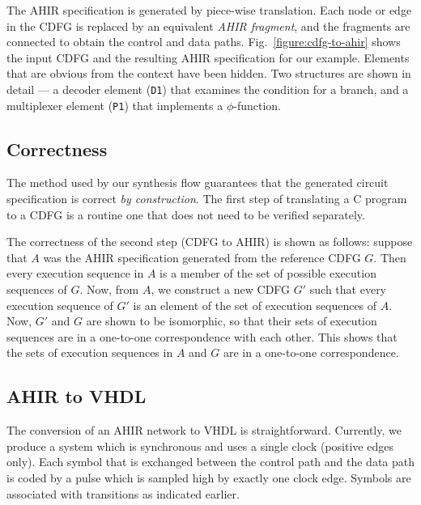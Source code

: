 \documentclass[conference]{IEEEtran}
\begin{document}
The AHIR specification is generated by piece-wise translation. Each
node or edge in the CDFG is replaced by an equivalent \emph{AHIR
  fragment}, and the fragments are connected to obtain the control and
data paths. Fig.~\ref{figure:cdfg-to-ahir} shows the input CDFG and
the resulting AHIR specification for our example. Elements that are
obvious from the context have been hidden. Two structures are shown in
detail --- a decoder element (\texttt{D1}) that examines the condition
for a branch, and a multiplexer element (\texttt{P1}) that implements
a $\phi$-function.

\subsection{Correctness}

The method used by our synthesis flow guarantees that the generated
circuit specification is correct {\em by construction}. The first step
of translating a C program to a CDFG is a routine one that does not
need to be verified separately. 

The correctness of the second step (CDFG to AHIR) is shown
as follows\cite{ahir_thesis}: suppose that
$A$ was the AHIR specification generated from the
reference CDFG $G$.  Then every execution sequence
in $A$ is a member of the set of
possible execution sequences of $G$.  Now,
from $A$, we construct a new CDFG $G'$ such
that every execution sequence of  $G'$  is
an element of the set of execution sequences
of $A$.  Now, $G'$ and $G$ are shown to be isomorphic,
so that their sets of execution sequences are in 
a one-to-one correspondence with each other.  This
shows that the sets of execution sequences in $A$ and
$G$ are in a one-to-one correspondence.

\subsection{AHIR to VHDL}

The conversion of an AHIR network to VHDL is straightforward.
Currently, we produce a system which is synchronous and uses
a single clock (positive edges only).  Each symbol that is
exchanged between the control path and the data path is coded 
by a pulse which is sampled high by exactly one clock
edge.  Symbols are associated with transitions as indicated
earlier.
\end{document}
